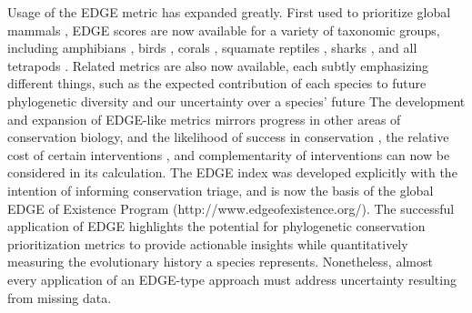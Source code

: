 \documentclass[10pt,english]{article}
\begin{document}
Usage of the EDGE metric has expanded greatly. First used to prioritize global
mammals \autocite{Isaac2007}, EDGE scores are now available for a variety of
taxonomic groups, including amphibians \autocite{Isaac2012}, birds
\autocite{Jetz2014}, corals \autocite{Curnick2015}, squamate reptiles
\autocite{Tonini2016}, sharks \autocite{Stein2018}, and all tetrapods
\autocite{Gumbs2018}. Related metrics are also now available, each subtly
emphasizing different things, such as the expected contribution of each species
to future phylogenetic diversity \autocite[HEDGE,
I-HEDGE;][]{Steel2007,Jensen2016} and our uncertainty over a species' future
\autocite[EDAM;][]{Pearse2015} The development and expansion of EDGE-like
metrics mirrors progress in other areas of conservation biology, and the
likelihood of success in conservation \autocite{Wilson2007, Mcbride2007}, the
relative cost of certain interventions \autocite{Naidoo2006}, and
complementarity of interventions \autocite{Pressey1993, Myers2000} can now be
considered in its calculation. The EDGE index was developed explicitly with the
intention of informing conservation triage, and is now the basis of the global
EDGE of Existence Program (http://www.edgeofexistence.org/). The successful
application of EDGE highlights the potential for phylogenetic conservation
prioritization metrics to provide actionable insights while quantitatively
measuring the evolutionary history a species represents. Nonetheless, almost
every application of an EDGE-type approach must address uncertainty resulting
from missing data. 
\end{document}
